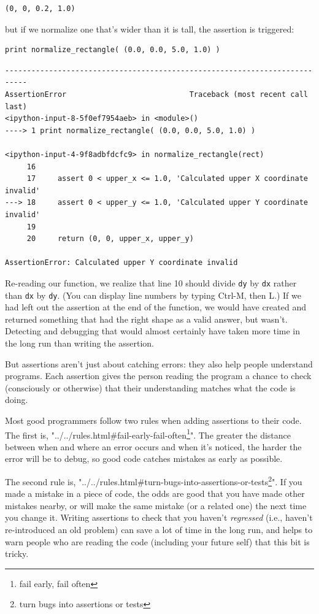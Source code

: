 \documentclass[]{book}
\newcommand{\urlfoot}[2]{{#1}\footnote{#2}}
\newcommand{\gdef}[2]{\emph{#2}}
\begin{document}
\begin{verbatim}
(0, 0, 0.2, 1.0)
\end{verbatim}

but if we normalize one that's wider than it is tall, the assertion is
triggered:

\begin{verbatim}
print normalize_rectangle( (0.0, 0.0, 5.0, 1.0) )
\end{verbatim}

\begin{verbatim}
---------------------------------------------------------------------------
AssertionError                            Traceback (most recent call last)
<ipython-input-8-5f0ef7954aeb> in <module>()
----> 1 print normalize_rectangle( (0.0, 0.0, 5.0, 1.0) )

<ipython-input-4-9f8adbfdcfc9> in normalize_rectangle(rect)
     16
     17     assert 0 < upper_x <= 1.0, 'Calculated upper X coordinate invalid'
---> 18     assert 0 < upper_y <= 1.0, 'Calculated upper Y coordinate invalid'
     19
     20     return (0, 0, upper_x, upper_y)

AssertionError: Calculated upper Y coordinate invalid
\end{verbatim}

Re-reading our function, we realize that line 10 should divide
\texttt{dy} by \texttt{dx} rather than \texttt{dx} by \texttt{dy}. (You
can display line numbers by typing Ctrl-M, then L.) If we had left out
the assertion at the end of the function, we would have created and
returned something that had the right shape as a valid answer, but
wasn't. Detecting and debugging that would almost certainly have taken
more time in the long run than writing the assertion.

But assertions aren't just about catching errors: they also help people
understand programs. Each assertion gives the person reading the program
a chance to check (consciously or otherwise) that their understanding
matches what the code is doing.

Most good programmers follow two rules when adding assertions to their
code. The first is, "\urlfoot{../../rules.html\#fail-early-fail-often}{fail
early, fail often}". The greater the distance between when and where an
error occurs and when it's noticed, the harder the error will be to
debug, so good code catches mistakes as early as possible.

The second rule is,
"\urlfoot{../../rules.html\#turn-bugs-into-assertions-or-tests}{turn bugs
into assertions or tests}". If you made a mistake in a piece of code,
the odds are good that you have made other mistakes nearby, or will make
the same mistake (or a related one) the next time you change it. Writing
assertions to check that you haven't \gdef{g:regression}{regressed}
(i.e., haven't re-introduced an old problem) can save a lot of time in
the long run, and helps to warn people who are reading the code
(including your future self) that this bit is tricky.
\end{document}
